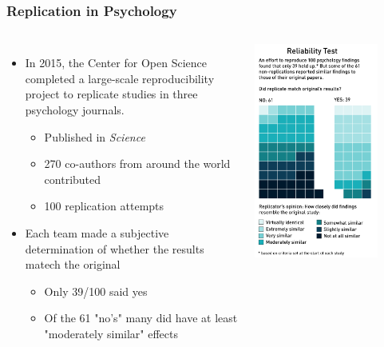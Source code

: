 \documentclass[10pt, block=fill]{beamer}
\begin{document}
\begin{frame}
  \frametitle{Replication in Psychology}
  
  \begin{columns}
    \begin{itemize}
      \item In 2015, the Center for Open Science completed a large-scale reproducibility project to replicate studies in three psychology journals.
      \begin{itemize}
        \item Published in \textit{Science}
        \item 270 co-authors from around the world contributed
        \item 100 replication attempts
      \end{itemize}
      \item Each team made a subjective determination of whether the results matech the original
      \begin{itemize}
        \item Only 39/100 said yes
        \item Of the 61 "no's" many did have at least "moderately similar" effects
      \end{itemize}
    \end{itemize}
    
      \includegraphics[width=0.8\textwidth]{figures/reliability_test.png}
  \end{columns}
    
\end{frame}
\end{document}
